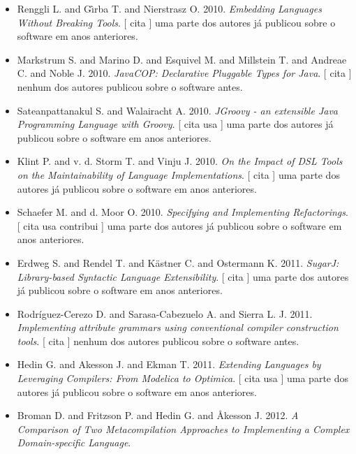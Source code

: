 \begin{itemize}
      [
          cita
      ]
uma parte dos autores já publicou sobre o software em anos anteriores.
\item Renggli L. and G\^{\i}rba T. and Nierstrasz O.
      2010.
        \textit{ Embedding Languages Without Breaking Tools}.
      [
          cita
      ]
uma parte dos autores já publicou sobre o software em anos anteriores.
\item Markstrum S. and Marino D. and Esquivel M. and Millstein T. and Andreae C. and Noble J.
      2010.
        \textit{ JavaCOP: Declarative Pluggable Types for Java}.
      [
          cita
      ]
nenhum dos autores publicou sobre o software antes.
\item Sateanpattanakul S. and Walairacht A.
      2010.
        \textit{ JGroovy - an extensible Java Programming Language with Groovy}.
      [
          cita
          usa
      ]
uma parte dos autores já publicou sobre o software em anos anteriores.
\item Klint P. and v. d. Storm T. and Vinju J.
      2010.
        \textit{ On the Impact of DSL Tools on the Maintainability of Language Implementations}.
      [
          cita
      ]
uma parte dos autores já publicou sobre o software em anos anteriores.
\item Schaefer M. and d. Moor O.
      2010.
        \textit{ Specifying and Implementing Refactorings}.
      [
          cita
          usa
          contribui
      ]
uma parte dos autores já publicou sobre o software em anos anteriores.
\item Erdweg S. and Rendel T. and K\"{a}stner C. and Ostermann K.
      2011.
        \textit{ SugarJ: Library-based Syntactic Language Extensibility}.
      [
          cita
      ]
uma parte dos autores já publicou sobre o software em anos anteriores.
\item Rodríguez-Cerezo D. and Sarasa-Cabezuelo A. and Sierra L. J.
      2011.
        \textit{ Implementing attribute grammars using conventional compiler construction tools}.
      [
          cita
      ]
nenhum dos autores publicou sobre o software antes.
\item Hedin G. and Akesson J. and Ekman T.
      2011.
        \textit{ Extending Languages by Leveraging Compilers: From Modelica to Optimica}.
      [
          cita
          usa
      ]
uma parte dos autores já publicou sobre o software em anos anteriores.
\item Broman D. and Fritzson P. and Hedin G. and Åkesson J.
      2012.
        \textit{ A Comparison of Two Metacompilation Approaches to Implementing a Complex Domain-specific Language}.

\end{itemize}
